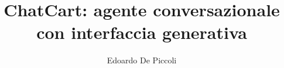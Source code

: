 
\newcommand{\TitoloTesi}{ChatCart: agente conversazionale con interfaccia generativa}
\newcommand{\AutoreTesi}{Edoardo De Piccoli}
\newcommand{\Matricola}{2101055}
\newcommand{\Relatore}{Prof.\ Tullio Vardanega}
\newcommand{\AnnoAccademico}{2025-2026}

\title{\TitoloTesi}
\author{\AutoreTesi}
\date{}

\usepackage[margin=3cm]{geometry}
\usepackage{fontspec}
\usepackage{lmodern}
\usepackage[italian]{babel}
\usepackage{microtype}
\usepackage{setspace}
\usepackage{parskip}
\usepackage{enumitem}
\makeatletter
{}
\makeatother
\setlength{\emergencystretch}{3em}
\setcounter{secnumdepth}{2}
\setcounter{tocdepth}{2}

\usepackage[bottom]{footmisc}

\usepackage{titlesec}
\titleformat{\chapter}[hang]{\normalfont\huge\bfseries}{\thechapter}{0.8em}{}
\titlespacing*{\chapter}{0pt}{70pt}{40pt}

\usepackage{graphicx}
\usepackage[table,dvipsnames]{xcolor}

